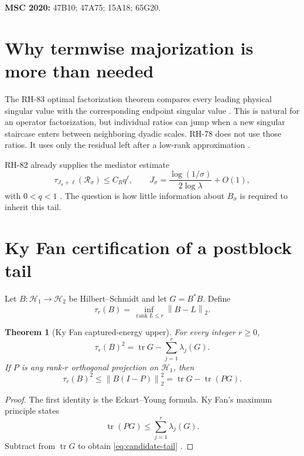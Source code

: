 \documentclass[11pt]{article}
\newtheorem{theorem}{Theorem}[section]
\theoremstyle{remark}
\newcommand{\norm}[1]{\left\lVert#1\right\rVert}
\newcommand{\cR}{\mathcal R}
\begin{document}
\medskip
\noindent\textbf{MSC 2020:} 47B10; 47A75; 15A18; 65G20.

\section{Why termwise majorization is more than needed}

The RH-83 optimal factorization theorem compares every leading physical
singular value with the corresponding endpoint singular value
\citep{WangSingularFactor2026}.  This is natural for an operator
factorization, but individual ratios can jump when a new singular staircase
enters between neighboring dyadic scales.  RH-78 does not use those ratios.
It uses only the residual left after a low-rank approximation
\citep{WangEffectiveRank2026}.

RH-82 already supplies the mediator estimate
\begin{equation}
 \tau_{J_\sigma+\ell}(\cR_\sigma)
 \le C_Rq^\ell,
 \qquad J_\sigma=\frac{\log(1/\sigma)}{2\log\lambda}+O(1),
 \label{eq:endpoint-tail}
\end{equation}
with $0<q<1$ \citep{WangHalfLog2026}.  The question is how little information
about $B_\sigma$ is required to inherit this tail.

\section{Ky Fan certification of a postblock tail}

Let $B:\mathcal H_1\to\mathcal H_2$ be Hilbert--Schmidt and let
$G=B^*B$.  Define
\[
 \tau_r(B)=\inf_{\operatorname{rank}L\le r}\norm{B-L}_2.
\]

\begin{theorem}[Ky Fan captured-energy upper]
\label{thm:kyfan}
For every integer $r\ge0$,
\begin{equation}
 \tau_r(B)^2
 =\operatorname{tr}G-\sum_{j=1}^r\lambda_j(G).
 \label{eq:optimal-tail}
\end{equation}
If $P$ is any rank-$r$ orthogonal projection on $\mathcal H_1$, then
\begin{equation}
 \boxed{
 \tau_r(B)^2\le\norm{B(I-P)}_2^2
 =\operatorname{tr}G-\operatorname{tr}(PG).}
 \label{eq:candidate-tail}
\end{equation}
\end{theorem}

\begin{proof}
The first identity is the Eckart--Young formula.  Ky Fan's maximum principle
states
\[
 \operatorname{tr}(PG)
 \le\sum_{j=1}^r\lambda_j(G).
\]
Subtract from $\operatorname{tr}G$ to obtain
\eqref{eq:candidate-tail} \citep{Bhatia1997}.
\end{proof}
\end{document}
